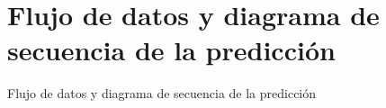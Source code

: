 \section{Flujo de datos y diagrama de secuencia de la predicción}
    Flujo de datos y diagrama de secuencia de la predicción
    